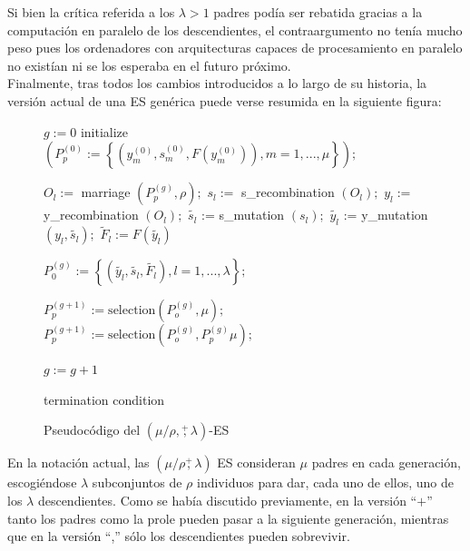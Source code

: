 \documentclass[12pt]{article} \usepackage[utf8x]{inputenc}
\begin{document}
Si bien la crítica referida a los $\lambda > 1$ padres podía ser
rebatida gracias a la computación en paralelo de los descendientes, el
contraargumento no tenía mucho peso pues los ordenadores con
arquitecturas capaces de procesamiento en paralelo no existían ni se
los esperaba en el futuro próximo. \\

Finalmente, tras todos los cambios introducidos a lo largo de su
historia, la versión actual de una ES genérica puede verse resumida en la
siguiente figura:

\begin{figure}
\begin{algorithm}[H]
  \begin{algorithmic}[1]
    \label{ES-alg}
    \State $g := 0$
    \State initialize $\left( P_p^{(0)} := \left\{ \left(y_m^{(0)},
            s_m^{(0)}, F(y_m^{(0)}) \right), m = 1, ..., \mu \right\}
    \right);$
    \Repeat

    \State $O_l :=$ marriage $\left( P_p^{(g)}, \rho \right);$
    \State $s_l :=$ s\_recombination $\left( O_l \right);$
    \State $y_l :=$ y\_recombination $\left( O_l \right);$
    \State $\tilde{s_l}$ := s\_mutation $\left( s_l \right);$
    \State $\tilde{y_l}$ := y\_mutation $\left( y_l, \tilde{s_l} \right);$
    \State $\tilde{F}_l := F(\tilde{y_l})$
    \EndFor

    \State $P_0^{(g)} := \left\{ \left( \tilde{y_l}, \tilde{s_l},
          \tilde{F_l} \right), l = 1, ..., \lambda \right\};$

    \State $P_p^{(g+1)} := \mathrm{selection} \left( P_o^{(g)}, \mu \right);$
    \State $P_p^{(g+1)} := \mathrm{selection} \left( P_o^{(g)}, P_p^{(g)} \mu \right);$
    \EndIf

    \State $g := g + 1$

    \Until termination condition
    \EndProcedure
  \end{algorithmic}
\end{algorithm}
  \caption{Pseudocódigo del $\left( \mu / \rho, \overset{+}{,} \lambda \right)$-ES \cite{paper-es-salva}}
\end{figure}

En la notación actual, las $(\mu / \rho \overset{+}{,} \lambda)$ ES consideran $\mu$ padres en cada generación, escogiéndose $\lambda$ subconjuntos de $\rho$ individuos para dar, cada uno de ellos, uno de los $\lambda$ descendientes. Como se había discutido previamente, en la versión ``$+$'' tanto los padres como la prole pueden pasar a la siguiente generación, mientras que en la versión ``,'' sólo los descendientes pueden sobrevivir. \\
\end{document}

